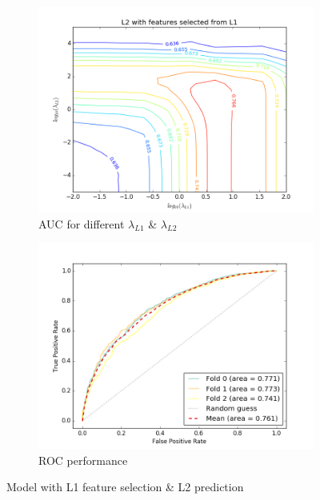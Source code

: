\documentclass[paper=a4,fontsize=12pt]{article}
\begin{document}
\begin{figure}[H]
\centering
\begin{subfigure}{.5\textwidth}
  \centering
  \includegraphics[width=1\linewidth]{contourplot_auc}
  \caption{AUC for different $\lambda_{L1}$ \& $\lambda_{L2}$}
  \label{fig:sub1}
\end{subfigure}%
\begin{subfigure}{.5\textwidth}
  \centering
  \includegraphics[width=1\linewidth]{07_L2regularisation_L1selectedf}
  \caption{ROC performance}
  \label{fig:sub2}
\end{subfigure}
\caption{Model with L1 feature selection \& L2 prediction}
\label{fig:test}
\end{figure}
\end{document}
